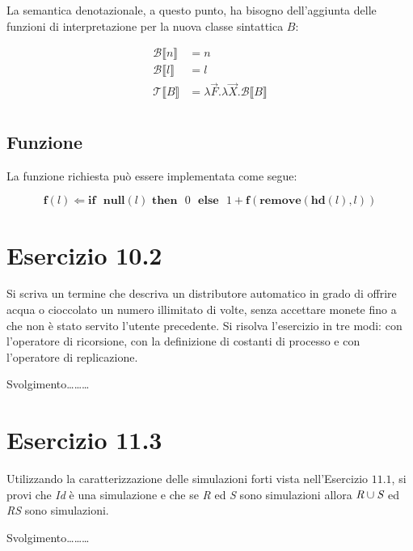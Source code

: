 		La semantica denotazionale, a questo punto, ha bisogno dell'aggiunta delle funzioni di interpretazione per la nuova classe sintattica $B$:
		
		\begin{align*}
		\mathcal{B} \llbracket n \rrbracket & = n\\
		\mathcal{B} \llbracket l \rrbracket & = l\\
		\mathcal{T} \llbracket B \rrbracket & = \lambda \overrightarrow{F}.\lambda \overrightarrow{X}.\mathcal{B} \llbracket B \rrbracket\\		
		\end{align*}
		
		\subsection{Funzione}
		\qquad La funzione richiesta pu\`o essere implementata come segue:
		
		$$\textbf{f}(l) \Leftarrow \textbf{if}\text{ }\textbf{null}(l)\text{
		}\textbf{then}\text{ }0\text{ }\textbf{else}\text{ }1 +
		\textbf{f}(\textbf{remove}(\textbf{hd}(l),l))$$
		
		\newpage
		
	\section{Esercizio 10.2}
		\qquad Si scriva un termine che descriva un distributore automatico in grado
		di offrire acqua o cioccolato un numero illimitato di volte, senza accettare
		monete fino a che non \`e stato servito l'utente precedente. Si risolva
		l'esercizio in tre modi: con l'operatore di ricorsione, con la definizione di
		costanti di processo e con l'operatore di replicazione.
		
		\sectionline
		
		\qquad Svolgimento\ldots\ldots\ldots
		
		\newpage
		
	\section{Esercizio 11.3}
		\qquad Utilizzando la caratterizzazione delle simulazioni forti vista
		nell'Esercizio $11.1$, si provi che \emph{Id} \`e una simulazione e che se
		\emph{R} ed \emph{S} sono simulazioni allora $\emph{R} \cup \emph{S}$ ed
		\emph{RS} sono simulazioni.
		
		\sectionline
		
		\qquad Svolgimento\ldots\ldots\ldots
		
